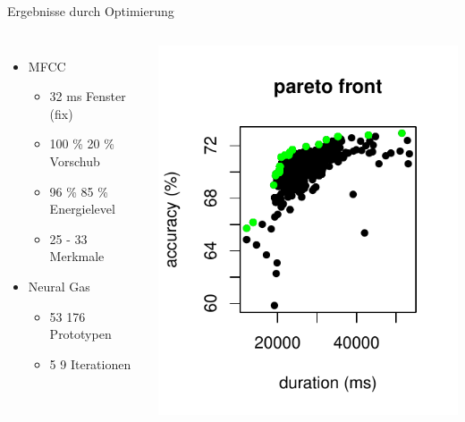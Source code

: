 \begin{frame}{Ergebnisse durch Optimierung}
	\begin{columns}
		\begin{itemize}
			\item MFCC
			\begin{itemize}[<1->]
				\item 32 ms Fenster (fix)
				\item 100 \%  20 \% Vorschub
				\item 96 \%  85 \% Energielevel
				\item 25 - 33 Merkmale
			\end{itemize}
			\item Neural Gas
			\begin{itemize}[<1->]
				\item 53  176 Prototypen
				\item 5  9 Iterationen
			\end{itemize}
		\end{itemize}
		\begin{center}
			\includegraphics[width=1.0\textwidth]{img/eaPareto}
		\end{center} 
	\end{columns}
\end{frame}
